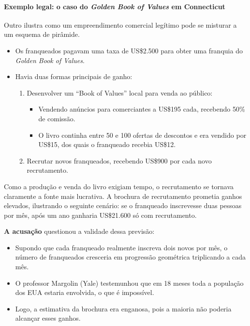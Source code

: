 \documentclass[a4paper,12pt]{article}
\begin{document}
\paragraph{Exemplo legal: o caso do \textit{Golden Book of Values} em
  Connecticut \cite{naruk}}

Outro ilustra como um empreendimento comercial legítimo pode se
misturar a um esquema de pirâmide.
\begin{itemize}[noitemsep]
\item Os franqueados pagavam uma taxa de US\$2.500 para obter uma
  franquia do \textit{Golden Book of Values}.
\item Havia duas formas principais de ganho:
  \begin{enumerate}[label=(\alph*),noitemsep]
  \item Desenvolver um ``Book of Values'' local para venda ao público:
    \begin{itemize}
    \item Vendendo anúncios para comerciantes a US\$195 cada, recebendo
      50\% de comissão.
    \item O livro continha entre 50 e 100 ofertas de descontos e era
      vendido por US\$15, dos quais o franqueado recebia US\$12.
    \end{itemize}
  \item Recrutar novos franqueados, recebendo US\$900 por cada novo
    recrutamento.
  \end{enumerate}
\end{itemize}

Como a produção e venda do livro exigiam tempo, o recrutamento se
tornava claramente a fonte mais lucrativa. A brochura de recrutamento
prometia ganhos elevados, ilustrando o seguinte cenário: se o
franqueado inscrevesse duas pessoas por mês, após um ano ganharia
US\$21.600 só com recrutamento.

\textbf{A acusação} questionou a validade dessa previsão:
\begin{itemize}[noitemsep]
\item Supondo que cada franqueado realmente inscreva dois novos por
  mês, o número de franqueados cresceria em progressão geométrica
  triplicando a cada mês.
\item O professor Margolin (Yale) testemunhou que em 18 meses toda a
  população dos EUA estaria envolvida, o que é impossível.
\item Logo, a estimativa da brochura era enganosa, pois a maioria não
  poderia alcançar esses ganhos.
\end{itemize}
\end{document}
